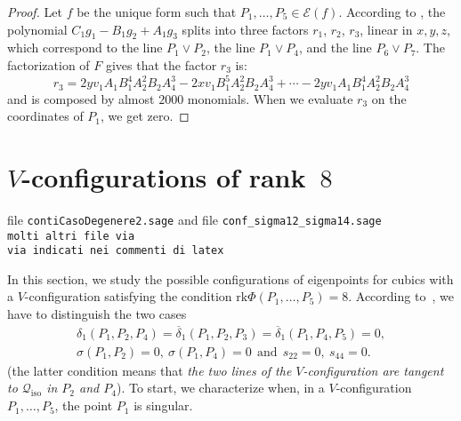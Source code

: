 \documentclass{amsart}
\theoremstyle{plain}
\theoremstyle{definition}
\newcommand{\iso}{\mathcal{Q}_{\mathrm{iso}}}
\newcommand{\Eig}[1]{\mathcal{E}\!\left( {#1} \right)}
\newcommand{\rk}{\ensuremath{\mathrm{rk}}}
\begin{document}
\begin{proof}
Let $f$ be the unique form such that $P_1, \dotsc, P_5 \in \Eig{f}$.
According to , the polynomial
$C_1g_1-B_1g_2+A_1g_3$ splits into three factors $r_1$, $r_2$, $r_3$,
linear in $x, y, z$, which
correspond to the line $P_1 \vee P_2$, the line $P_1 \vee P_4$, and the line $P_6 \vee P_7$.
The factorization of $F$ gives that the factor $r_3$ is:
\[
r_3 = 2yv_1A_1B_1^4A_2^2B_2A_4^3-2xv_1B_1^5A_2^2B_2A_4^3+\cdots
-2 yv_1A_1B_1^4A_2^2B_2A_4^3
\]
and is composed by almost $2000$ monomials. When we
evaluate $r_3$ on the coordinates of $P_1$, we get zero.
\end{proof}

\section{\texorpdfstring{$V$}{V}-configurations of rank~\texorpdfstring{$8$}{8}}
\label{rank_8}
file \verb+contiCasoDegenere2.sage+ and file
\verb+conf_sigma12_sigma14.sage+\\
\verb+molti altri file via +\\
\verb+via indicati nei commenti di latex+

In this section, we study the possible configurations of
eigenpoints for cubics with a $V$-configuration
satisfying the condition $\rk \Phi(P_1, \dots, P_5) = 8$. According
to~, we have to distinguish the two cases
%
\begin{gather}
\delta_1(P_1, P_2, P_4)=\overline{\delta}_1(P_1, P_2, P_3) =
\overline{\delta}_1(P_1, P_4, P_5) = 0,
\label{rk8_1}\\
\sigma(P_1, P_2) = 0, \ \sigma(P_1, P_4) = 0 \ \ \mbox{and} \ \ s_{22} = 0,
\ s_{44} = 0.
\label{rk8_2}
\end{gather}
%
(the latter condition means that \emph{the two lines of
the $V$-configuration are tangent to $\iso$ in $P_2$ and $P_4$}).
%
To start, we characterize when, in a $V$-configuration
$P_1, \dotsc, P_5$, the point $P_1$ is singular.
\end{document}
